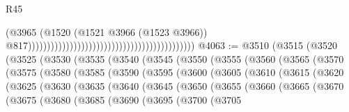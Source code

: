 \begin{lexlean}{R45}
\begin{coremodule}
{                                                                                        (@3965
                                                                                          (@1520
                                                                                            (@1521
                                                                                              @3966
                                                                                              (@1523
                                                                                                @3966))
                                                                                            @817))))))))))))))))))))))))))))))))))))))))))))
@4063 := @3510
    (@3515
      (@3520
        (@3525
          (@3530
            (@3535
              (@3540
                (@3545
                  (@3550
                    (@3555
                      (@3560
                        (@3565
                          (@3570
                            (@3575
                              (@3580
                                (@3585
                                  (@3590
                                    (@3595
                                      (@3600
                                        (@3605
                                          (@3610
                                            (@3615
                                              (@3620
                                                (@3625
                                                  (@3630
                                                    (@3635
                                                      (@3640
                                                        (@3645
                                                          (@3650
                                                            (@3655
                                                              (@3660
                                                                (@3665
                                                                  (@3670
                                                                    (@3675
                                                                      (@3680
                                                                        (@3685
                                                                          (@3690
                                                                            (@3695
                                                                              (@3700
                                                                                (@3705
}
\end{coremodule}
\end{lexlean}
